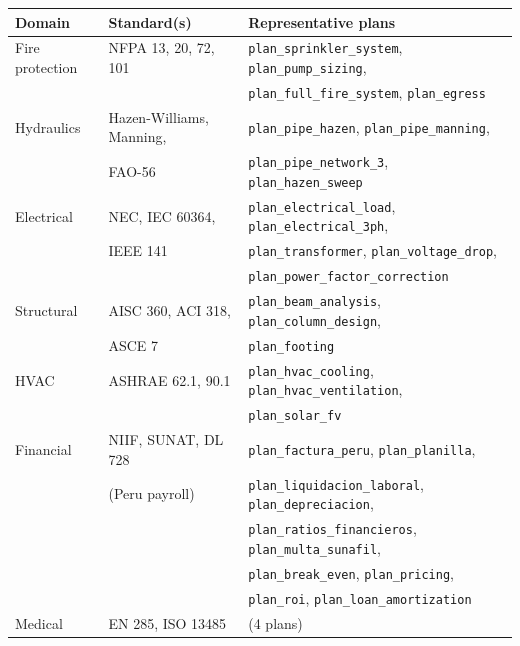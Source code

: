 \documentclass[11pt,a4paper]{article}
\begin{document}
\begin{table}[h]
\centering
\small
\begin{tabular}{lll}
\toprule
Domain & Standard(s) & Representative plans \\
\midrule
Fire protection & NFPA 13, 20, 72, 101 & \texttt{plan\_sprinkler\_system}, \texttt{plan\_pump\_sizing}, \\
                &                       & \texttt{plan\_full\_fire\_system}, \texttt{plan\_egress} \\
\addlinespace
Hydraulics      & Hazen-Williams, Manning, & \texttt{plan\_pipe\_hazen}, \texttt{plan\_pipe\_manning}, \\
                & FAO-56                & \texttt{plan\_pipe\_network\_3}, \texttt{plan\_hazen\_sweep} \\
\addlinespace
Electrical      & NEC, IEC 60364,       & \texttt{plan\_electrical\_load}, \texttt{plan\_electrical\_3ph}, \\
                & IEEE 141              & \texttt{plan\_transformer}, \texttt{plan\_voltage\_drop}, \\
                &                       & \texttt{plan\_power\_factor\_correction} \\
\addlinespace
Structural      & AISC 360, ACI 318,    & \texttt{plan\_beam\_analysis}, \texttt{plan\_column\_design}, \\
                & ASCE 7                & \texttt{plan\_footing} \\
\addlinespace
HVAC            & ASHRAE 62.1, 90.1     & \texttt{plan\_hvac\_cooling}, \texttt{plan\_hvac\_ventilation}, \\
                &                       & \texttt{plan\_solar\_fv} \\
\addlinespace
Financial       & NIIF, SUNAT, DL 728   & \texttt{plan\_factura\_peru}, \texttt{plan\_planilla}, \\
                & (Peru payroll)        & \texttt{plan\_liquidacion\_laboral}, \texttt{plan\_depreciacion}, \\
                &                       & \texttt{plan\_ratios\_financieros}, \texttt{plan\_multa\_sunafil}, \\
                &                       & \texttt{plan\_break\_even}, \texttt{plan\_pricing}, \\
                &                       & \texttt{plan\_roi}, \texttt{plan\_loan\_amortization} \\
\addlinespace
Medical         & EN 285, ISO 13485     & (4 plans) \\

\end{tabular}
\end{table}
\end{document}

